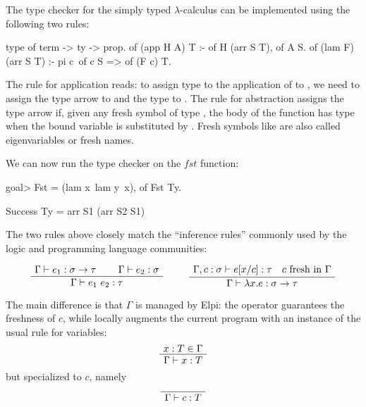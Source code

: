 \documentclass{these-ISSS}
\newenvironment{bprooftree}
  {\leavevmode\hbox\bgroup}
  {\DisplayProof\egroup}
\newenvironment{elpicode}
  {\VerbatimEnvironment\begin{elpibox}\begin{xelpicode}}{\end{xelpicode}
\end{elpibox}}
\newenvironment{elpioutput}
  {\VerbatimEnvironment\begin{outputbox}\begin{xelpicode}}{\end{xelpicode}
\end{outputbox}}
\begin{document}
The type checker for the simply typed $\lambda$-calculus can be implemented
using the following two rules:

\begin{elpicode}
type of term -> ty -> prop.
of (app H A) T :- of H (arr S T), of A S.
of (lam F) (arr S T) :- pi c\ of c S => of (F c) T.
\end{elpicode}

The rule for application reads: to assign type  to the application of
 to , we need to assign the type  arrow  to
 and the type  to . The rule for abstraction assigns
the type  arrow  if, given any fresh symbol  of type
, the body of the function  has type  when the bound
variable is substituted by .
Fresh symbols like  are also called eigenvariables or fresh names.

We can now run the type checker on the $fst$ function:
\begin{elpioutput}
goal> Fst = (lam x\ lam y\ x), of Fst Ty.

Success
  Ty = arr S1 (arr S2 S1)
\end{elpioutput}

The two rules above closely match the ``inference rules'' commonly used by the
logic and programming language communities:
\label{inf:stlc}

$$
\begin{bprooftree}
  \AxiomC{$\Gamma \vdash e_1 : \sigma \to \tau$}
  \AxiomC{$\Gamma \vdash e_2 : \sigma$}
  \BinaryInfC{$\Gamma \vdash e_1~e_2 : \tau$}
\end{bprooftree}
\qquad
\begin{bprooftree}
  \AxiomC{$\Gamma, c : \sigma \vdash e[x/c] : \tau \quad c~\mathrm{fresh~in}~\Gamma$}
  \UnaryInfC{$\Gamma \vdash \lambda x.e : \sigma \to \tau$}
\end{bprooftree}
$$



The main difference is that $\Gamma$ is managed by Elpi: the 
operator guarantees the freshness of $c$, while \elpi{=>} locally augments the
current program with an instance of the usual rule for variables:
$$
\begin{bprooftree}
  \AxiomC{$x : T \in \Gamma$}
  \UnaryInfC{$\Gamma \vdash x : T$}
\end{bprooftree}
$$
\noindent but specialized to $c$, namely
$$
\begin{bprooftree}
  \AxiomC{}
  \UnaryInfC{$\Gamma \vdash c : T$}
\end{bprooftree}
$$
\end{document}
